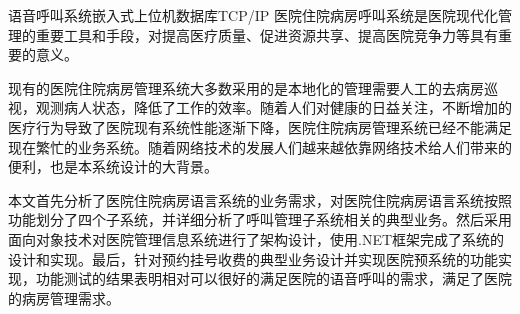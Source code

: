 
\begin{Cabstract}{语音呼叫系统}{嵌入式}{上位机}{数据库}{TCP/IP}
医院住院病房呼叫系统是医院现代化管理的重要工具和手段，对提高医疗质量、促进资源共享、提高医院竞争力等具有重要的意义。

现有的医院住院病房管理系统大多数采用的是本地化的管理需要人工的去病房巡视，观测病人状态，降低了工作的效率。随着人们对健康的日益关注，不断增加的医疗行为导致了医院现有系统性能逐渐下降，医院住院病房管理系统已经不能满足现在繁忙的业务系统。随着网络技术的发展人们越来越依靠网络技术给人们带来的便利，也是本系统设计的大背景。

本文首先分析了医院住院病房语言系统的业务需求，对医院住院病房语言系统按照功能划分了四个子系统，并详细分析了呼叫管理子系统相关的典型业务。然后采用面向对象技术对医院管理信息系统进行了架构设计，使用.NET框架完成了系统的设计和实现。最后，针对预约挂号收费的典型业务设计并实现医院预系统的功能实现，功能测试的结果表明相对可以很好的满足医院的语音呼叫的需求，满足了医院的病房管理需求。
\end{Cabstract}

